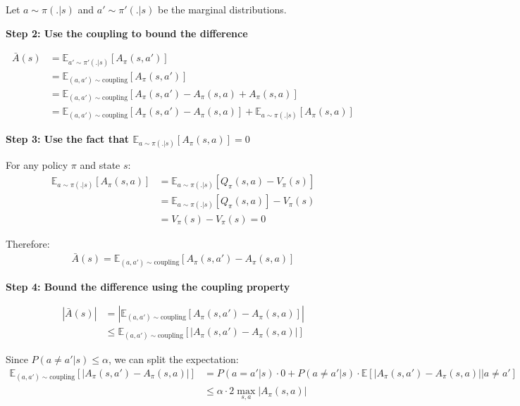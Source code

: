 Let $a \sim \pi(.|s)$ and $a' \sim \pi'(.|s)$ be the marginal distributions.

\textbf{Step 2: Use the coupling to bound the difference}

\begin{align}
\bar{A}(s) &= \mathbb{E}_{a' \sim \pi'(.|s)}[A_{\pi}(s, a')] \\
&= \mathbb{E}_{(a,a') \sim \text{coupling}}[A_{\pi}(s, a')] \\
&= \mathbb{E}_{(a,a') \sim \text{coupling}}[A_{\pi}(s, a') - A_{\pi}(s, a) + A_{\pi}(s, a)] \\
&= \mathbb{E}_{(a,a') \sim \text{coupling}}[A_{\pi}(s, a') - A_{\pi}(s, a)] + \mathbb{E}_{a \sim \pi(.|s)}[A_{\pi}(s, a)]
\end{align}

\textbf{Step 3: Use the fact that $\mathbb{E}_{a \sim \pi(.|s)}[A_{\pi}(s, a)] = 0$}

For any policy $\pi$ and state $s$:
\begin{align}
\mathbb{E}_{a \sim \pi(.|s)}[A_{\pi}(s, a)] &= \mathbb{E}_{a \sim \pi(.|s)}[Q_{\pi}(s, a) - V_{\pi}(s)] \\
&= \mathbb{E}_{a \sim \pi(.|s)}[Q_{\pi}(s, a)] - V_{\pi}(s) \\
&= V_{\pi}(s) - V_{\pi}(s) = 0
\end{align}

Therefore:
\begin{align}
\bar{A}(s) = \mathbb{E}_{(a,a') \sim \text{coupling}}[A_{\pi}(s, a') - A_{\pi}(s, a)]
\end{align}

\textbf{Step 4: Bound the difference using the coupling property}

\begin{align}
|\bar{A}(s)| &= \left| \mathbb{E}_{(a,a') \sim \text{coupling}}[A_{\pi}(s, a') - A_{\pi}(s, a)] \right| \\
&\le \mathbb{E}_{(a,a') \sim \text{coupling}}[|A_{\pi}(s, a') - A_{\pi}(s, a)|]
\end{align}

Since $P(a \neq a'|s) \le \alpha$, we can split the expectation:
\begin{align}
\mathbb{E}_{(a,a') \sim \text{coupling}}[|A_{\pi}(s, a') - A_{\pi}(s, a)|] &= P(a = a'|s) \cdot 0 + P(a \neq a'|s) \cdot \mathbb{E}[|A_{\pi}(s, a') - A_{\pi}(s, a)| | a \neq a'] \\
&\le \alpha \cdot 2\max_{s, a}|A_{\pi}(s,a)|
\end{align}

